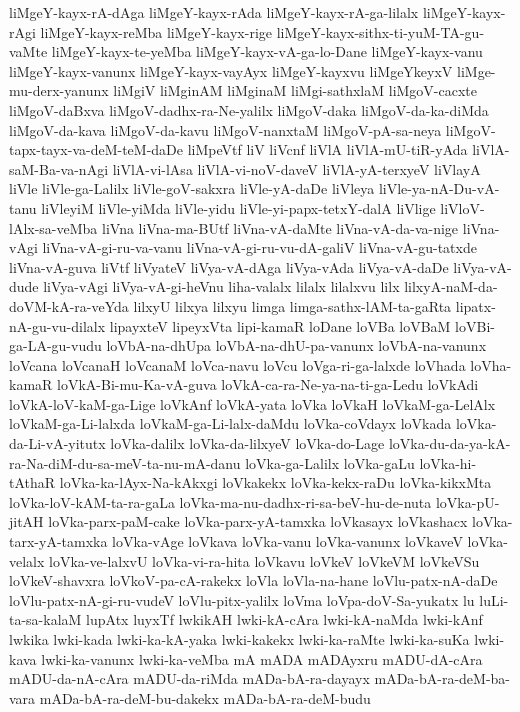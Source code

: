 {liMgeY-kayx-rA-dAga
liMgeY-kayx-rAda
liMgeY-kayx-rA-ga-lilalx
liMgeY-kayx-rAgi
liMgeY-kayx-reMba
liMgeY-kayx-rige
liMgeY-kayx-sithx-ti-yuM-TA-gu-vaMte
liMgeY-kayx-te-yeMba
liMgeY-kayx-vA-ga-lo-Dane
liMgeY-kayx-vanu
liMgeY-kayx-vanunx
liMgeY-kayx-vayAyx
liMgeY-kayxvu
liMgeYkeyxV
liMge-mu-derx-yanunx
liMgiV
liMginAM
liMginaM
liMgi-sathxlaM
liMgoV-cacxte
liMgoV-daBxva
liMgoV-dadhx-ra-Ne-yalilx
liMgoV-daka
liMgoV-da-ka-diMda
liMgoV-da-kava
liMgoV-da-kavu
liMgoV-nanxtaM
liMgoV-pA-sa-neya
liMgoV-tapx-tayx-va-deM-teM-daDe
liMpeVtf
liV
liVcnf
liVlA
liVlA-mU-tiR-yAda
liVlA-saM-Ba-va-nAgi
liVlA-vi-lAsa
liVlA-vi-noV-daveV
liVlA-yA-terxyeV
liVlayA
liVle
liVle-ga-Lalilx
liVle-goV-sakxra
liVle-yA-daDe
liVleya
liVle-ya-nA-Du-vA-tanu
liVleyiM
liVle-yiMda
liVle-yidu
liVle-yi-papx-tetxY-dalA
liVlige
liVloV-lAlx-sa-veMba
liVna
liVna-ma-BUtf
liVna-vA-daMte
liVna-vA-da-va-nige
liVna-vAgi
liVna-vA-gi-ru-va-vanu
liVna-vA-gi-ru-vu-dA-galiV
liVna-vA-gu-tatxde
liVna-vA-guva
liVtf
liVyateV
liVya-vA-dAga
liVya-vAda
liVya-vA-daDe
liVya-vA-dude
liVya-vAgi
liVya-vA-gi-heVnu
liha-valalx
lilalx
lilalxvu
lilx
lilxyA-naM-da-doVM-kA-ra-veYda
lilxyU
lilxya
lilxyu
limga
limga-sathx-lAM-ta-gaRta
lipatx-nA-gu-vu-dilalx
lipayxteV
lipeyxVta
lipi-kamaR
loDane
loVBa
loVBaM
loVBi-ga-LA-gu-vudu
loVbA-na-dhUpa
loVbA-na-dhU-pa-vanunx
loVbA-na-vanunx
loVcana
loVcanaH
loVcanaM
loVca-navu
loVcu
loVga-ri-ga-lalxde
loVhada
loVha-kamaR
loVkA-Bi-mu-Ka-vA-guva
loVkA-ca-ra-Ne-ya-na-ti-ga-Ledu
loVkAdi
loVkA-loV-kaM-ga-Lige
loVkAnf
loVkA-yata
loVka
loVkaH
loVkaM-ga-LelAlx
loVkaM-ga-Li-lalxda
loVkaM-ga-Li-lalx-daMdu
loVka-coVdayx
loVkada
loVka-da-Li-vA-yitutx
loVka-dalilx
loVka-da-lilxyeV
loVka-do-Lage
loVka-du-da-ya-kA-ra-Na-diM-du-sa-meV-ta-nu-mA-danu
loVka-ga-Lalilx
loVka-gaLu
loVka-hi-tAthaR
loVka-ka-lAyx-Na-kAkxgi
loVkakekx
loVka-kekx-raDu
loVka-kikxMta
loVka-loV-kAM-ta-ra-gaLa
loVka-ma-nu-dadhx-ri-sa-beV-hu-de-nuta
loVka-pU-jitAH
loVka-parx-paM-cake
loVka-parx-yA-tamxka
loVkasayx
loVkashacx
loVka-tarx-yA-tamxka
loVka-vAge
loVkava
loVka-vanu
loVka-vanunx
loVkaveV
loVka-velalx
loVka-ve-lalxvU
loVka-vi-ra-hita
loVkavu
loVkeV
loVkeVM
loVkeVSu
loVkeV-shavxra
loVkoV-pa-cA-rakekx
loVla
loVla-na-hane
loVlu-patx-nA-daDe
loVlu-patx-nA-gi-ru-vudeV
loVlu-pitx-yalilx
loVma
loVpa-doV-Sa-yukatx
lu
luLi-ta-sa-kalaM
lupAtx
luyxTf
lwkikAH
lwki-kA-cAra
lwki-kA-naMda
lwki-kAnf
lwkika
lwki-kada
lwki-ka-kA-yaka
lwki-kakekx
lwki-ka-raMte
lwki-ka-suKa
lwki-kava
lwki-ka-vanunx
lwki-ka-veMba
mA
mADA
mADAyxru
mADU-dA-cAra
mADU-da-nA-cAra
mADU-da-riMda
mADa-bA-ra-dayayx
mADa-bA-ra-deM-ba-vara
mADa-bA-ra-deM-bu-dakekx
mADa-bA-ra-deM-budu
}
